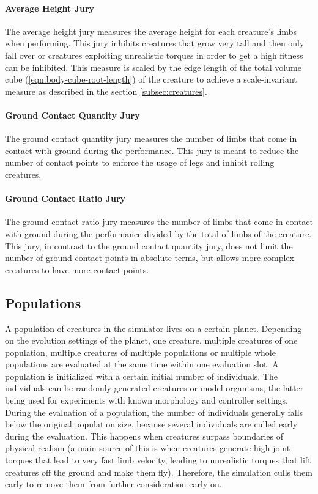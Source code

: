 \documentclass[main]{subfiles}
\begin{document}
\paragraph{Average Height Jury} The average height jury measures the average height for each creature's limbs when performing. %
%
This jury inhibits creatures that grow very tall and then only fall over or creatures exploiting unrealistic torques in order to get a high fitness can be inhibited. %
%
This measure is scaled by the edge length of the total volume cube (\eqref{eqn:body-cube-root-length}) of the creature to achieve a scale-invariant measure as described in the section \ref{subsec:creatures}.

\paragraph{Ground Contact Quantity Jury} The ground contact quantity jury measures the number of limbs that come in contact with ground during the performance. %
%
This jury is meant to reduce the number of contact points to enforce the usage of legs and inhibit rolling creatures.

\paragraph{Ground Contact Ratio Jury} The ground contact ratio jury measures the number of limbs that come in contact with ground during the performance divided by the total of limbs of the creature. %
%
This jury, in contrast to the ground contact quantity jury, does not limit the number of ground contact points in absolute terms, but allows more complex creatures to have more contact points.

\subsection{Populations}
\label{subsec:populations}

A population of creatures in the simulator lives on a certain planet. %
%
Depending on the evolution settings of the planet, one creature, multiple creatures of one population, multiple creatures of multiple populations or multiple whole populations are evaluated at the same time within one evaluation slot. %
%
A population is initialized with a certain initial number of individuals. %
%
The individuals can be randomly generated creatures or model organisms, the latter being used for experiments with known morphology and controller settings. %
%
During the evaluation of a population, the number of individuals generally falls below the original population size, because several individuals are culled early during the evaluation. %
%
This happens when creatures surpass boundaries of physical realism (a main source of this is when creatures generate high joint torques that lead to very fast limb velocity, leading to unrealistic torques that lift creatures off the ground and make them fly). %
%
Therefore, the simulation culls them early to remove them from further consideration early on.
\end{document}
